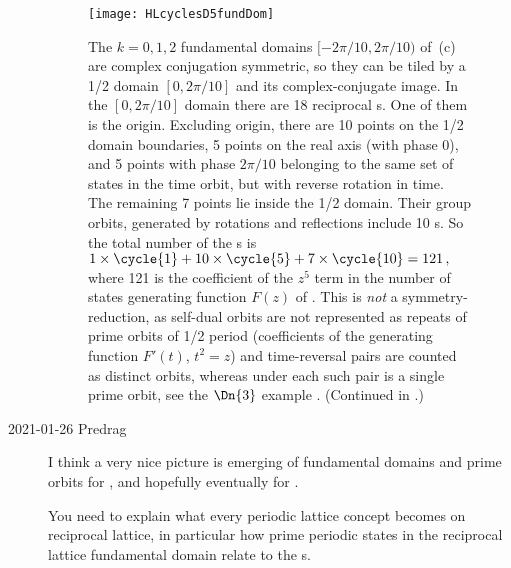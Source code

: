 \begin{description}
\begin{figure}
\texttt{[image: HLcyclesD5fundDom]}
\\ %

  \caption{\label{fig:HLcyclesD5inC5}
The   $k=0,1,2$ fundamental domains $[-2\pi/10,2\pi/10)$ of
\,(c) are complex conjugation symmetric,
so they can be tiled by a 1/2 domain $[0,2\pi/10]$ and its
complex-conjugate image.
In the $[0,2\pi/10]$ domain there are 18 reciprocal {\lattstate}s.
One of them is the origin. Excluding origin, there are 10 points on the
1/2 domain boundaries,
5 points on the real axis (with phase 0), and 5 points with phase
$2\pi/10$ belonging to the same set of states in the time orbit, but with
reverse rotation in time.
The remaining 7 points lie inside the 1/2
domain. Their group orbits, generated by rotations and reflections
include 10 {\lattstate}s.
So the total number of the  {\lattstate}s is
\(
1 \times \cycle{1} + 10 \times \cycle{5} + 7 \times \cycle{10} = 121 \,,
\)
where 121 is the coefficient of the $z^{5}$ term in the number of states
generating function $F(z)$ of
.
This is \emph{not} a  symmetry-reduction, as self-dual orbits are
not represented as repeats of prime orbits of 1/2 period (coefficients of
the   generating function $F'(t)$, $t^2=z$) and
time-reversal pairs are counted as distinct orbits, whereas under 
each such pair is a single prime orbit, see the $\Dn{3}$ example
.
(Continued in .)
          }
\end{figure}

    \item[2021-01-26 Predrag]
I think a very nice picture is emerging of fundamental domains and prime
orbits for \templatt, and hopefully eventually for \catlatt.

You need to explain what every periodic lattice concept becomes on
reciprocal lattice, in particular how prime periodic states in the
reciprocal lattice fundamental domain relate to the {\lattstate}s.


\end{description}
